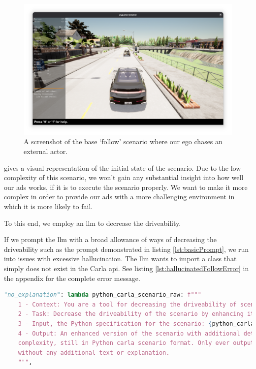 \begin{figure}[htbp]
    \centering
    \includegraphics[width=\textwidth]{experiment-material/follow-base-startpoint.png}
    \caption{A screenshot of the base `follow' scenario where our ego chases an external actor.}\label{fig:followBaseStartpoint}
\end{figure}

 gives a visual representation of the initial state of the scenario.
Due to the low complexity of this scenario, we won't gain any substantial insight into how well our
\acrshort{ads} works, if it is to execute the scenario properly. We want to make it more complex in
order to provide our \acrshort{ads} with a more challenging environment in which it is more likely
to fail.

To this end, we employ an \acrshort{llm} to decrease the driveability.

If we prompt the \acrshort{llm} with a broad allowance of ways of decreasing the driveability such
as the prompt demonstrated in listing \ref{lst:basicPrompt}, we run into issues with excessive
hallucination. The \acrshort{llm} wants to import a class that simply does not exist in the Carla
\acrshort{api}. See listing \ref{lst:hallucinatedFollowError} in the  appendix for the complete error message.


\begin{lstlisting}[language=python, label={lst:basicPrompt}, caption={The most basic prompt first used in the experiments. This leads to excessive halluciantion.}]
            "no_explanation": lambda python_carla_scenario_raw: f"""
    1 - Context: You are a tool for decreasing the driveability of scenarios in the driving simulator Carla.
    2 - Task: Decrease the driveability of the scenario by enhancing it with more details and complexity.
    3 - Input, the Python specification for the scenario: {python_carla_scenario_raw}
    4 - Output: An enhanced version of the scenario with additional details and
    complexity, still in Python carla scenario format. Only ever output the code,
    without any additional text or explanation.
    """,
\end{lstlisting}


